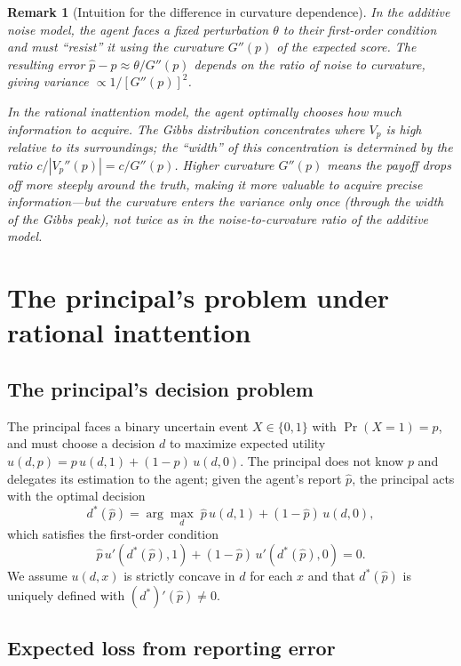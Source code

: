 \documentclass[11pt]{article}
\newtheorem{remark}{Remark}
\begin{document}
\begin{remark}[Intuition for the difference in curvature dependence]
In the additive noise model, the agent faces a fixed perturbation $\theta$ to their first-order condition and must ``resist'' it using the curvature $G''(p)$ of the expected score. The resulting error $\hat{p} - p \approx \theta/G''(p)$ depends on the ratio of noise to curvature, giving variance $\propto 1/[G''(p)]^2$.

In the rational inattention model, the agent optimally chooses how much information to acquire. The Gibbs distribution concentrates where $V_p$ is high relative to its surroundings; the ``width'' of this concentration is determined by the ratio $c/|V_p''(p)| = c/G''(p)$. Higher curvature $G''(p)$ means the payoff drops off more steeply around the truth, making it more valuable to acquire precise information---but the curvature enters the variance only once (through the width of the Gibbs peak), not twice as in the noise-to-curvature ratio of the additive model.
\end{remark}


\section{The principal's problem under rational inattention}

\subsection{The principal's decision problem}

The principal faces a binary uncertain event $X \in \{0,1\}$ with $\Pr(X=1) = p$, and must choose a decision $d$ to maximize expected utility $u(d,p) = p\,u(d,1) + (1-p)\,u(d,0)$. The principal does not know $p$ and delegates its estimation to the agent; given the agent's report $\hat{p}$, the principal acts with the optimal decision
\[
d^*(\hat{p}) = \arg\max_d\; \hat{p}\,u(d,1) + (1-\hat{p})\,u(d,0),
\]
which satisfies the first-order condition
\begin{equation}\label{eq:principal-foc}
\hat{p}\,u'(d^*(\hat{p}),1) + (1-\hat{p})\,u'(d^*(\hat{p}),0) = 0.
\end{equation}
We assume $u(d,x)$ is strictly concave in $d$ for each $x$ and that $d^*(\hat{p})$ is uniquely defined with $(d^*)'(\hat{p}) \neq 0$.

\subsection{Expected loss from reporting error}
\end{document}
